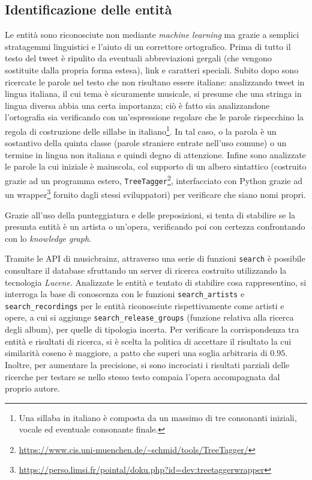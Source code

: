\documentclass[12pt, a4paper, twocolumn]{article} %
\begin{document}
\subsection{Identificazione delle entità}
Le entità sono riconosciute non mediante \textit{machine learning} ma grazie a semplici stratagemmi linguistici e l'aiuto di un correttore ortografico.
Prima di tutto il testo del tweet è ripulito da eventuali abbreviazioni gergali (che vengono sostituite dalla propria forma estesa), link e caratteri speciali.
Subito dopo sono ricercate le parole nel testo che non risultano essere italiane: analizzando tweet in lingua italiana, il cui tema è sicuramente musicale, si presume che una stringa in lingua diversa abbia una certa importanza; ciò è fatto sia analizzandone l'ortografia sia verificando con un'espressione regolare che le parole rispecchino la regola di costruzione delle sillabe in italiano\footnote{Una sillaba in italiano è composta da un massimo di tre consonanti iniziali, vocale ed eventuale consonante finale.}.
In tal caso, o la parola è un sostantivo della quinta classe (parole straniere entrate nell'uso comune) o un termine in lingua non italiana e quindi degno di attenzione.
Infine sono analizzate le parole la cui iniziale è maiuscola, col supporto di un albero sintattico (costruito grazie ad un programma estero, \verb|TreeTagger|\footnote{\url{https://www.cis.uni-muenchen.de/~schmid/tools/TreeTagger/}}, interfacciato con Python grazie ad un wrapper\footnote{\url{https://perso.limsi.fr/pointal/doku.php?id=dev:treetaggerwrapper}} fornito dagli stessi sviluppatori) per verificare che siano nomi propri.

Grazie all'uso della punteggiatura e delle preposizioni, si tenta di stabilire se la presunta entità è un artista o un'opera, verificando poi con certezza confrontando con lo \textit{knowledge graph}. \newline

Tramite le API di musicbrainz, attraverso una serie di funzioni \verb|search| è possibile consultare il database sfruttando un server di ricerca costruito utilizzando la tecnologia \textit{Lucene}.
Analizzate le entità e tentato di stabilire cosa rappresentino, si interroga la base di conoscenza con le funzioni \verb|search_artists| e \verb|search_recordings| per le entità riconosciute rispettivamente come artisti e opere, a cui si aggiunge \verb|search_release_groups| (funzione relativa alla ricerca degli album), per quelle di tipologia incerta.
Per verificare la corrispondenza tra entità e risultati di ricerca, si è scelta la politica di accettare il risultato la cui similarità coseno è maggiore, a patto che superi una soglia arbitraria di $0.95$.
Inoltre, per aumentare la precisione, si sono incrociati i risultati parziali delle ricerche per testare se nello stesso testo compaia l'opera accompagnata dal proprio autore.
\end{document}
